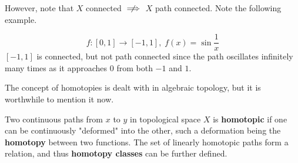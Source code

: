     \begin{center}
    \end{center}

    However, note that $X$ connected $\centernot\implies$ $X$ path connected. Note the following example. 

    \begin{example}
    \[ f:[0,1] \longrightarrow [-1,1], \; f(x) = \sin{\frac{1}{x}}\]
    $[-1,1]$ is connected, but not path connected since the path oscillates infinitely many times as it approaches $0$ from both $-1$ and $1$. 
    \end{example}

    The concept of homotopies is dealt with in algebraic topology, but it is worthwhile to mention it now. 

    \begin{definition}
    Two continuous paths from $x$ to $y$ in topological space $X$ is \textbf{homotopic} if one can be continuously "deformed" into the other, such a deformation being the \textbf{homotopy} between two functions. The set of linearly homotopic paths form a relation, and thus \textbf{homotopy classes} can be further defined. 
    \end{definition}

